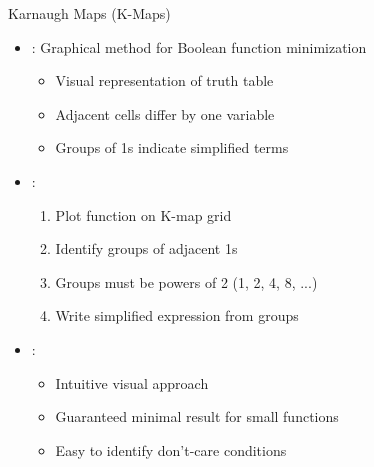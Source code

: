 \begin{frame}{Karnaugh Maps (K-Maps)}
\begin{itemize}
\item {}: Graphical method for Boolean function minimization
\begin{itemize}
\item Visual representation of truth table
\item Adjacent cells differ by one variable
\item Groups of 1s indicate simplified terms
\end{itemize}
\vspace{0.5cm}
\item {}:
\begin{enumerate}
\item Plot function on K-map grid
\item Identify groups of adjacent 1s
\item Groups must be powers of 2 (1, 2, 4, 8, ...)
\item Write simplified expression from groups
\end{enumerate}
\vspace{0.3cm}
\item {}:
\begin{itemize}
\item Intuitive visual approach
\item Guaranteed minimal result for small functions
\item Easy to identify don't-care conditions
\end{itemize}
\end{itemize}
\end{frame}

